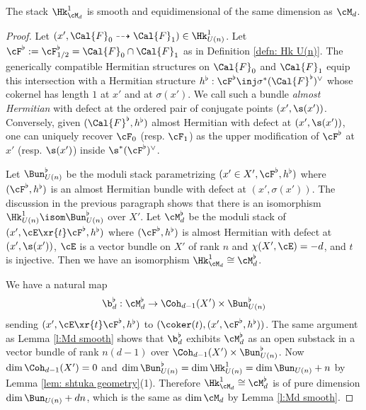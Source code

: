 \begin{lemma}
\notready\label{l:HkMd sm} The stack $\Hk^{1}_{\cM_{d}}$ is smooth and equidimensional of the same dimension as $\cM_{d}$.
\end{lemma}
\begin{proof}
Let $(x',\Cal{F}_0 \dashrightarrow \Cal{F}_1) \in \Hk_{U(n)}^1$. Let $\cF^{\flat}:=\cF^{\flat}_{1/2}=\Cal{F}_0 \cap \Cal{F}_1$ as in Definition \ref{defn: Hk U(n)}.
The generically compatible Hermitian structures on $\Cal{F}_0$ and $\Cal{F}_1$ equip this intersection with a Hermitian structure $h^{\flat}: \cF^{\flat} \inj \sigma^* (\Cal{F}^{\flat})^{\vee}$ whose cokernel has length $1$ at $x'$ and at $\sigma (x')$. We call such a bundle {\em almost Hermitian} with defect at the ordered pair of conjugate points $(x',\s(x'))$. Conversely, given $(\Cal{F}^{\flat},h^{\flat})$ almost Hermitian with defect at $(x', \s(x'))$, one can uniquely recover $\cF_{0}$ (resp. $\cF_{1}$) as the upper modification of $\cF^{\flat}$ at $x'$ (resp. $\s(x')$) inside $\s^{*}(\cF^{\flat})^{\vee}$.

Let $\Bun^{\flat}_{U(n)}$ be the moduli stack parametrizing  $(x'\in X', \cF^{\flat}, h^{\flat})$ where $(\cF^{\flat}, h^{\flat})$ is an almost Hermitian bundle with defect at $(x',\sigma(x'))$. The discussion in the previous paragraph shows that there is an isomorphism $\Hk^{1}_{U(n)}\isom \Bun^{\flat}_{U(n)}$ over $X'$.
Let $\cM^{\flat}_{d}$ be the moduli stack of $(x',\cE\xr{t}\cF^{\flat}, h^{\flat})$ where $(\cF^{\flat}, h^{\flat})$ is almost Hermitian with defect at $(x',\s(x'))$, $\cE$ is a vector bundle on $X'$ of rank $n$ and $\chi(X',\cE)=-d$, and $t$ is injective. Then we have an isomorphism $\Hk^{1}_{\cM_{d}}\cong \cM^{\flat}_{d}$.


We have a natural map
\begin{equation}
\b^{\flat}_{d}: \cM^{\flat}_{d}\to \Coh_{d-1}(X')\times \Bun^{\flat}_{U(n)}
\end{equation}
sending $(x',\cE\xr{t}\cF^{\flat}, h^{\flat})$ to $(\coker(t), (x',\cF^{\flat}, h^{\flat}))$. The same argument as Lemma \ref{l:Md smooth} shows that $\b^{\flat}_{d}$ exhibits $\cM^{\flat}_{d}$ as an open substack in a vector bundle of rank $n(d-1)$ over $\Coh_{d-1}(X')\times \Bun^{\flat}_{U(n)}$. Now $\dim \Coh_{d-1}(X')=0$ and $\dim \Bun^{\flat}_{U(n)}=\dim \Hk^{1}_{U(n)}=\dim \Bun_{U(n)}+n$ by Lemma \ref{lem: shtuka geometry}(1). Therefore $\Hk^{1}_{\cM_{d}}\cong \cM^{\flat}_{d}$ is of pure dimension $\dim \Bun_{U(n)}+dn$, which is the same as $\dim \cM_{d}$ by Lemma \ref{l:Md smooth}.
\end{proof}

